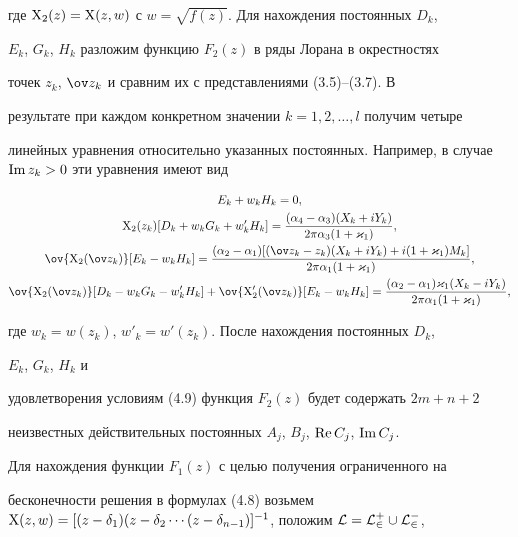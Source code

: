 где $\mathrm X_2(z)=\mathrm X(z,w)$ с $w=\sqrt{f(z)}$. Для нахождения постоянных $D_k$, 


$E_k$, $G_k$, $H_k$ разложим функцию $F_2(z)$ в ряды Лорана в окрестностях 


точек $z_k$, $\ov z_k$ и сравним их с представлениями (3.5)--(3.7). В 


результате при каждом конкретном значении $k=1,2,\dotsc,l$ получим четыре 


линейных уравнения относительно указанных постоянных. Например, в случае $\im 


z_k>0$ эти уравнения имеют вид 


\begin{gather*} 


E_k+w_k H_k=0,\\ 


\X_2(z_k)[D_k+w_k G_k+w'_k H_k]= 


\frac{(\alpha_4-\alpha_3)(X_k+iY_k)}{2\pi\alpha_3(1+\varkappa_1)},\\ 


\ov{\X_2(\ov z_k)}[E_k-w_k H_k]= 


\frac{(\alpha_2-\alpha_1)[(\ov z_k-z_k)(X_k+iY_k) 


+i(1+\varkappa_1)M_k]}{2\pi\alpha_1(1+\varkappa_1)},\\ 


\ov{\X_2(\ov z_k)}[D_k-w_k G_k-w'_k H_k]+ 


\ov{\X'_2(\ov z_k)}[E_k-w_k H_k]= 


\frac{(\alpha_2-\alpha_1)\varkappa_1(X_k-iY_k)} 


{2\pi\alpha_1(1+\varkappa_1)}, 


\end{gather*} 


где $w_k=w(z_k)$, $w'_k=w'(z_k)$. После нахождения постоянных $D_k$, 


$E_k$, $G_k$, $H_k$ и 


удовлетворения условиям (4.9) функция $F_2(z)$ будет содержать $2m+n+2$ 


неизвестных действительных постоянных $A_j$, $B_j$, $\operatorname{Re} C_j$, $\operatorname{Im} C_j$. 


 


Для нахождения функции $F_1(z)$ с целью получения ограниченного на 


бесконечности решения в формулах (4.8) возьмем $\X(z,w)=[(z-\delta_1) 


(z-\delta_2\dotsb(z-\delta_{n-1})]^{-1}$, положим $\cal L=L^+_2\cup L^-_2$, 


